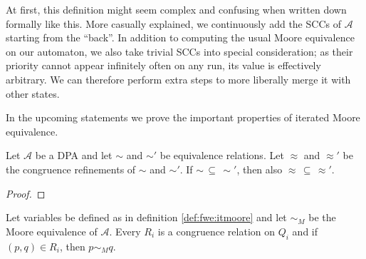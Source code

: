 At first, this definition might seem complex and confusing when written down formally like this. %
More casually explained, we continuously add the SCCs of $\mathcal{A}$ starting from the \enquote{back}. In addition to computing the usual Moore equivalence on our automaton, we also take trivial SCCs into special consideration; as their priority cannot appear infinitely often on any run, its value is effectively arbitrary. We can therefore perform extra steps to more liberally merge it with other states.

In the upcoming statements we prove the important properties of iterated Moore equivalence.

\begin{lem}
\label{lem:fwe:cong_refin_subset}
	Let $\mathcal{A}$ be a DPA and let $\sim$ and $\sim'$ be equivalence relations. Let $\approx$ and $\approx'$ be the congruence refinements of $\sim$ and $\sim'$. If $\sim \,\subseteq\, \sim'$, then also $\approx \,\subseteq\, \approx'$.
\end{lem}

\begin{proof}
\end{proof}

\begin{lem}
	Let variables be defined as in definition \ref{def:fwe:itmoore} and let $\sim_M$ be the Moore equivalence of $\mathcal{A}$. Every $R_i$ is a congruence relation on $Q_i$ and if $(p, q) \in R_i$, then $p \sim_M q$.
\end{lem}

